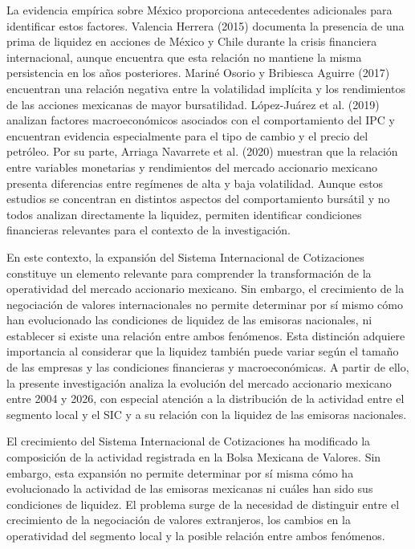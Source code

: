 La evidencia empírica sobre México proporciona antecedentes adicionales para identificar estos factores. Valencia Herrera (2015) documenta la presencia de una prima de liquidez en acciones de México y Chile durante la crisis financiera internacional, aunque encuentra que esta relación no mantiene la misma persistencia en los años posteriores. Mariné Osorio y Bribiesca Aguirre (2017) encuentran una relación negativa entre la volatilidad implícita y los rendimientos de las acciones mexicanas de mayor bursatilidad. López-Juárez et al. (2019) analizan factores macroeconómicos asociados con el comportamiento del IPC y encuentran evidencia especialmente para el tipo de cambio y el precio del petróleo. Por su parte, Arriaga Navarrete et al. (2020) muestran que la relación entre variables monetarias y rendimientos del mercado accionario mexicano presenta diferencias entre regímenes de alta y baja volatilidad. Aunque estos estudios se concentran en distintos aspectos del comportamiento bursátil y no todos analizan directamente la liquidez, permiten identificar condiciones financieras relevantes para el contexto de la investigación.

En este contexto, la expansión del Sistema Internacional de Cotizaciones constituye un elemento relevante para comprender la transformación de la operatividad del mercado accionario mexicano. Sin embargo, el crecimiento de la negociación de valores internacionales no permite determinar por sí mismo cómo han evolucionado las condiciones de liquidez de las emisoras nacionales, ni establecer si existe una relación entre ambos fenómenos. Esta distinción adquiere importancia al considerar que la liquidez también puede variar según el tamaño de las empresas y las condiciones financieras y macroeconómicas. A partir de ello, la presente investigación analiza la evolución del mercado accionario mexicano entre 2004 y 2026, con especial atención a la distribución de la actividad entre el segmento local y el SIC y a su relación con la liquidez de las emisoras nacionales.


El crecimiento del Sistema Internacional de Cotizaciones ha modificado la composición de la actividad registrada en la Bolsa Mexicana de Valores. Sin embargo, esta expansión no permite determinar por sí misma cómo ha evolucionado la actividad de las emisoras mexicanas ni cuáles han sido sus condiciones de liquidez. El problema surge de la necesidad de distinguir entre el crecimiento de la negociación de valores extranjeros, los cambios en la operatividad del segmento local y la posible relación entre ambos fenómenos.

